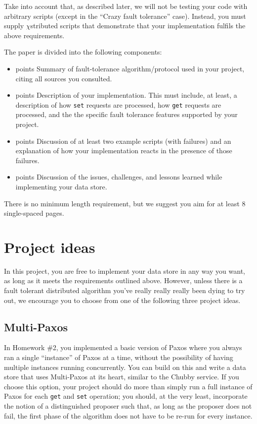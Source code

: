 \documentclass[12pt]{article}
\newcommand{\chistributed}{$\chi$\textsf{stributed} }
\newcommand{\points}[1]{{\sffamily\mdseries\guillemotleft #1 points\guillemotright{}}}
\begin{document}
Take into account that, as described later, we will not be testing your code with arbitrary scripts (except in the ``Crazy fault tolerance'' case). Instead, you must supply \chistributed scripts that demonstrate that your implementation fulfils the above requirements.

The paper is divided into the following components:

\begin{itemize}
\item \points{20} Summary of fault-tolerance algorithm/protocol used in your project, citing all sources you consulted.

\item \points{35} Description of your implementation. This must include, at least, a description of how \texttt{set} requests are processed, how \texttt{get} requests are processed, and the the specific fault tolerance features supported by your project.

\item \points{30} Discussion of at least two example scripts (with failures) and an explanation of how your implementation reacts in the presence of those failures.

\item \points{15} Discussion of the issues, challenges, and lessons learned while implementing your data store.
\end{itemize}

There is no minimum length requirement, but we suggest you aim for at least 8 single-spaced pages.


\section{Project ideas}
\label{sec:ideas}

In this project, you are free to implement your data store in any way you want, as long as it meets the requirements outlined above. However, unless there is a fault tolerant distributed algorithm you've really really really been dying to try out, we encourage you to choose from one of the following three project ideas.

\subsection{Multi-Paxos}

In Homework \#2, you implemented a basic version of Paxos where you always ran a single ``instance'' of Paxos at a time, without the possibility of having multiple instances running concurrently. You can build on this and write a data store that uses Multi-Paxos at its heart, similar to the Chubby service. If you choose this option, your project should do more than simply run a full instance of Paxos for each \texttt{get} and \texttt{set} operation; you should, at the very least, incorporate the notion of a distinguished proposer such that, as long as the proposer does not fail, the first phase of the algorithm does not have to be re-run for every instance.
\end{document}
